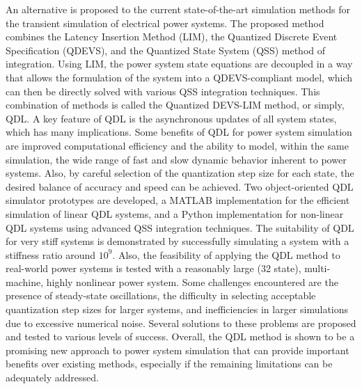 
An alternative is proposed to the current state-of-the-art simulation methods for the transient simulation of electrical power systems. The proposed method combines the Latency Insertion Method (LIM), the Quantized Discrete Event Specification (QDEVS), and the Quantized State System (QSS) method of integration. Using LIM, the power system state equations are decoupled in a way that allows the formulation of the system into a QDEVS-compliant model, which can then be directly solved with various QSS integration techniques. This combination of methods is called the Quantized DEVS-LIM method, or simply, QDL. A key feature of QDL is the asynchronous updates of all system states, which has many implications. Some benefits of QDL for power system simulation are improved computational efficiency and the ability to model, within the same simulation, the wide range of fast and slow dynamic behavior inherent to power systems. Also, by careful selection of the quantization step size for each state, the desired balance of accuracy and speed can be achieved. Two object-oriented QDL simulator prototypes are developed, a MATLAB implementation for the efficient simulation of linear QDL systems, and a Python implementation for non-linear QDL systems using advanced QSS integration techniques. The suitability of QDL for very stiff systems is demonstrated by successfully simulating a system with a stiffness ratio around $10^{9}$. Also, the feasibility of applying the QDL method to real-world power systems is tested with a reasonably large (32 state), multi-machine, highly nonlinear power system. Some challenges encountered are the presence of steady-state oscillations, the difficulty in selecting acceptable quantization step sizes for larger systems, and inefficiencies in larger simulations due to excessive numerical noise. Several solutions to these problems are proposed and tested to various levels of success. Overall, the QDL method is shown to be a promising new approach to power system simulation that can provide important benefits over existing methods, especially if the remaining limitations can be adequately addressed.   
